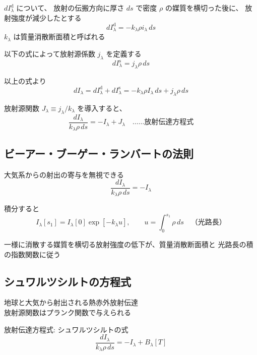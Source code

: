 \documentclass[article]{dennou777}
\begin{document}
$dI_\lambda^\mathrm{d}$ について、
放射の伝搬方向に厚さ $ds$ で密度 $\rho$ の媒質を横切った後に、
放射強度が減少したとする
\begin{equation}
	dI_\lambda^\mathrm{d}=-k_\lambda\rho i_\lambda\,ds
\end{equation}
$k_\lambda$ は質量消散断面積と呼ばれる

以下の式によって放射源係数 $j_\lambda$ を定義する
\begin{equation}
	dI_\lambda^\mathrm{s}=j_\lambda\rho\,ds
\end{equation}

以上の式より
\begin{equation}
	dI_\lambda=dI_\lambda^\mathrm{d}+dI_\lambda^\mathrm{s}
	=-k_\lambda\rho I_\lambda\,ds+j_\lambda\rho\,ds
\end{equation}

放射源関数 $J_\lambda\equiv j_\lambda/k_\lambda$ を導入すると、
\begin{equation}
	\frac{dI_\lambda}{k_\lambda\rho\,ds}=-I_\lambda+J_\lambda\quad\text{……放射伝達方程式}
\end{equation}

\subsection{ビーアー・ブーゲー・ランバートの法則}
大気系からの射出の寄与を無視できる
\begin{equation}
	\frac{dI_\lambda}{k_\lambda\rho\,ds}=-I_\lambda
\end{equation}

積分すると
\begin{equation}
	I_\lambda[s_1]=I_\lambda[0]\exp[-k_\lambda u],\qquad u=\int^{s_1}_0\rho\,ds\quad\text{（光路長）}
\end{equation}

一様に消散する媒質を横切る放射強度の低下が、質量消散断面積と
光路長の積の指数関数に従う

\subsection{シュワルツシルトの方程式}
地球と大気から射出される熱赤外放射伝達\\
放射源関数はプランク関数で与えられる

放射伝達方程式: シュワルツシルトの式
\begin{equation}
	\frac{dI_\lambda}{k_\lambda\rho\,ds}=-I_\lambda+B_\lambda[T]
\end{equation}
\end{document}
